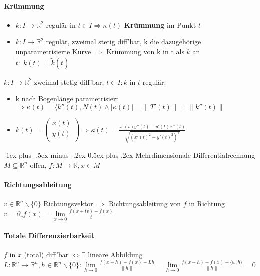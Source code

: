 \documentclass[paper=a3,paper=landscape, fontsize=9pt, DIV=30]{scrartcl}
\makeatletter
\newcommand{\real}{{\mathbb{R}}}
\renewcommand{\section}{\@startsection{section}{1}{0mm}%
  {-1ex plus -.5ex minus -.2ex}%
  {0.5ex plus .2ex}%
  {\color{blue}\normalfont\large\bfseries}}
\makeatother
\begin{document}
\begin{multicols*}{4}
  \paragraph{Krümmung}
  \begin{itemize}
  	\item $k: I \rightarrow \real^2$ regulär in $t \in I \Rightarrow \kappa(t)$ \textbf{Krümmung} im Punkt $t$
  	\item $k: I \rightarrow \real^2$ regulär, zweimal stetig diff'bar, k die dazugehörige unparametrisierte Kurve $\Rightarrow$ Krümmung von k in t als $\tilde{k}$ an $\tilde{t}:\;k(t)=\tilde{k}(\tilde{t})$
  \end{itemize}
	$k: I \rightarrow \real^2$ zweimal stetig diff'bar, $t \in I: k$ in $t$ regulär:
	\begin{itemize}
		\item k nach Bogenlänge parametrisiert $\Rightarrow \kappa(t)=\langle k''(t), N(t) \wedge \lvert \kappa(t)\rvert = \lVert T'(t) \rVert = \lVert k''(t) \rVert$
		\item $k(t) =
		\begin{pmatrix}
			x(t)\\y(t)\\
		\end{pmatrix}
		\Rightarrow \kappa(t)=\frac{x'(t)y''(t)-y'(t)x''(t)}{\sqrt{(x'(t)^2+y'(t)^2)^3}}$
	\end{itemize}
  \section{Mehrdimensionale Differentialrechnung}
	$M \subseteq \real^n$ offen, $f: M \rightarrow \real, x \in M$
	\paragraph{Richtungsableitung}
	$ v \in \real^n \backslash \{0\}$ Richtungsvektor $\Rightarrow$ Richtungsableitung von $f$ in Richtung $v = \partial_vf(x)= \lim\limits_{x \rightarrow 0} \frac{f(x+tv)-f(x)}{t}$

  \paragraph{Totale Differenzierbarkeit}
$f$ in $x$ (total) diff'bar $\Leftrightarrow \exists$ lineare Abbildung $L: \real^n \rightarrow \real^n, h \in \real^n \backslash \{0\}: \lim\limits_{h \rightarrow 0} \frac{f(x+h)-f(x)-Lh}{\lVert h \rVert} = \lim\limits_{h \rightarrow 0} \frac{f(x+h)-f(x)-\langle w,h \rangle}{\lVert h \rVert} = 0$


\end{multicols*}
\end{document}

